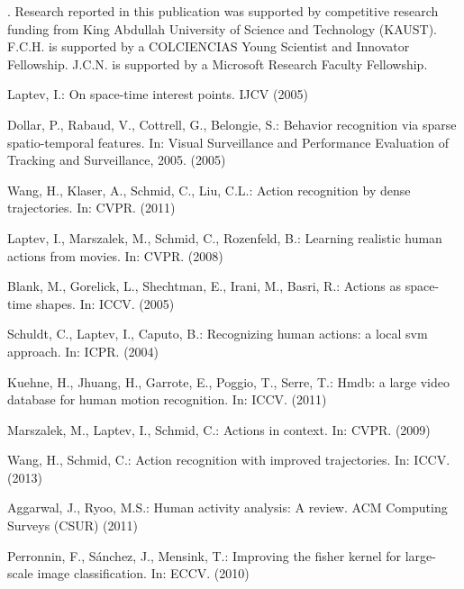 \documentclass[runningheads]{llncs}
\begin{document}
\vspace{3mm}
. Research reported in this publication was supported by competitive research funding from King Abdullah University of Science and Technology (KAUST). F.C.H. is supported by a COLCIENCIAS Young  Scientist and Innovator Fellowship. J.C.N. is supported by a Microsoft Research Faculty Fellowship. 



\begin{thebibliography}{10}

Laptev, I.:
\newblock On space-time interest points.
\newblock IJCV (2005)

Dollar, P., Rabaud, V., Cottrell, G., Belongie, S.:
\newblock Behavior recognition via sparse spatio-temporal features.
\newblock In: Visual Surveillance and Performance Evaluation of Tracking and
  Surveillance, 2005. (2005)

Wang, H., Klaser, A., Schmid, C., Liu, C.L.:
\newblock Action recognition by dense trajectories.
\newblock In: CVPR. (2011)

Laptev, I., Marszalek, M., Schmid, C., Rozenfeld, B.:
\newblock Learning realistic human actions from movies.
\newblock In: CVPR. (2008)

Blank, M., Gorelick, L., Shechtman, E., Irani, M., Basri, R.:
\newblock Actions as space-time shapes.
\newblock In: ICCV. (2005)

Schuldt, C., Laptev, I., Caputo, B.:
\newblock Recognizing human actions: a local svm approach.
\newblock In: ICPR. (2004)

Kuehne, H., Jhuang, H., Garrote, E., Poggio, T., Serre, T.:
\newblock Hmdb: a large video database for human motion recognition.
\newblock In: ICCV. (2011)

Marszalek, M., Laptev, I., Schmid, C.:
\newblock Actions in context.
\newblock In: CVPR. (2009)

Wang, H., Schmid, C.:
\newblock Action recognition with improved trajectories.
\newblock In: ICCV. (2013)

Aggarwal, J., Ryoo, M.S.:
\newblock Human activity analysis: A review.
\newblock ACM Computing Surveys (CSUR) (2011)

Perronnin, F., S{\'a}nchez, J., Mensink, T.:
\newblock Improving the fisher kernel for large-scale image classification.
\newblock In: ECCV.
\newblock (2010)


\end{thebibliography}
\end{document}

